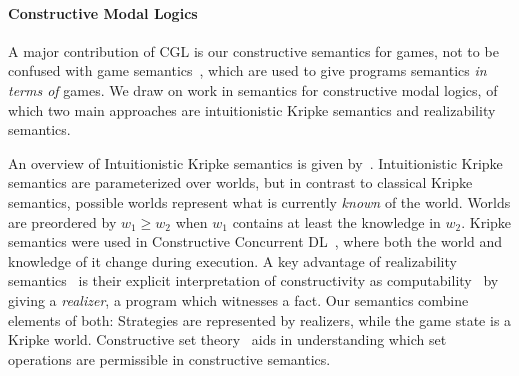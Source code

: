 \documentclass[12pt]{cmuthesis}
\theoremstyle{definition}
\theoremstyle{remark}
\newcommand{\DL}{\textsf{DL}\xspace}
\newcommand{\CGL}{\textsf{CGL}\xspace}
\begin{document}
\paragraph{Constructive Modal Logics}
A major contribution of \CGL is our constructive semantics for games, not to be confused with game semantics~\cite{DBLP:journals/iandc/AbramskyJM00}, which are used to give programs semantics \emph{in terms of} games.
We draw on work in semantics for constructive modal logics, of which two main approaches are intuitionistic Kripke semantics and realizability semantics.

An overview of Intuitionistic Kripke semantics is given by~\cite{DBLP:journals/apal/Wijesekera90}.
Intuitionistic Kripke semantics are parameterized over worlds, but in contrast to classical Kripke semantics, possible worlds represent what is currently \emph{known} of the world.
Worlds are preordered by $w_1 \geq w_2$ when $w_1$ contains at least the knowledge in $w_2$.
Kripke semantics were used in Constructive Concurrent \DL~\cite{DBLP:journals/apal/WijesekeraN05}, where both the world and knowledge of it change during execution.
A key advantage of realizability semantics~\cite{DBLP:journals/mscs/Oosten02,lipton1992constructive} is their explicit interpretation of constructivity as computability~\cite{DBLP:conf/cca/Bauer05} by giving a \emph{realizer}, a program which witnesses a fact.
Our semantics combine elements of both: Strategies are represented by realizers, while the game state is a Kripke world.
Constructive set theory~\cite{DBLP:journals/jsyml/AczelG06} aids in understanding which set operations are permissible in constructive semantics.
\end{document}
